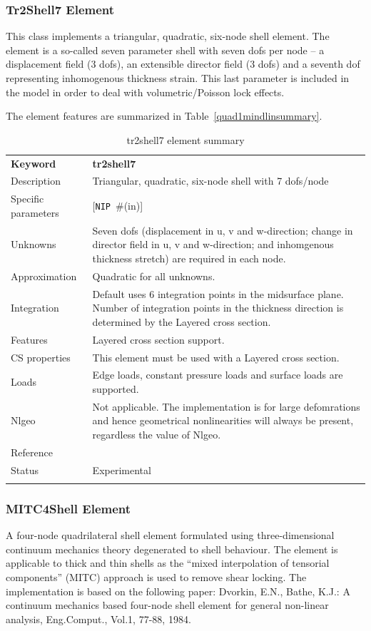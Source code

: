 \documentclass[a4paper]{article}
\newcommand{\param}[1]{\texttt{#1}} %
\newcommand{\optional}[1]{[#1]} %
\newcommand{\field}[2]{\param{#1}~\#{\tiny(#2)}} %
\newcommand{\optField}[2]{\optional{\field{#1}{#2}}}
\newcommand{\templabel}{}%
\newcommand{\tempcaption}{}%
\newcounter{nelpar}
\newenvironment{elementsummary}[5]{%
  \gdef\tempcaption{#4}%
  \gdef\templabel{#5}%
  \setcounter{nelpar}{0}%
  \begin{center} %
    \begin{table}[!htb] %
      \begin{tabular}{|l|p{9cm}|}\hline %
        {\bf Keyword} & \bf{#1}\\ %
        {Description} & {#2}\\ %
        {Specific parameters} & {#3}\\ \hline %
}{
  \\ \hline %
      \end{tabular}%
      \caption{\tempcaption}%
      \label{\templabel}%
    \end{table}%
  \end{center}%
}
\newcommand{\elementDescription}[2]{{#1} & {#2}\\}
\begin{document}
\subsubsection{Tr2Shell7 Element} \label{tr2shell7}
This class implements a triangular, quadratic, six-node shell element. The element is a so-called seven parameter shell with seven dofs per node -- a displacement field (3 dofs), an extensible director field (3 dofs) and a seventh dof representing inhomogenous thickness strain. This last parameter is included in the model in order to deal with volumetric/Poisson lock effects.

The element features are summarized in Table~\ref{quad1mindlinsummary}.

\begin{elementsummary}{tr2shell7}{Triangular, quadratic, six-node shell with 7 dofs/node}{\optField{NIP}{in}}{tr2shell7 element summary}{tr2shell7summary}

\elementDescription{Unknowns}{Seven dofs (displacement in u, v and w-direction; change in director field in u, v and w-direction; and inhomgenous thickness stretch) are required in each node.}
\elementDescription{Approximation}{Quadratic for all unknowns.}
\elementDescription{Integration}{Default uses 6 integration points in the midsurface plane. Number of integration points in the thickness direction is determined by the Layered cross section.}
\elementDescription{Features}{Layered cross section support.}
\elementDescription{CS properties}{This element must be used with a Layered cross section.}
\elementDescription{Loads}{Edge loads, constant pressure loads and surface loads are supported.}
\elementDescription{Nlgeo}{Not applicable. The implementation is for large defomrations and hence geometrical nonlinearities will always be present, regardless the value of Nlgeo.}
\elementDescription{Reference}{\cite{RagnarLarsson2011}}
\elementDescription{Status}{Experimental}
\end{elementsummary}



\subsubsection {MITC4Shell Element}
A four-node quadrilateral shell element formulated using three-dimensional continuum mechanics theory degenerated to shell behaviour. The element is applicable to thick and thin shells as the ``mixed interpolation of tensorial components'' (MITC) approach is used to remove shear locking. The implementation is based on the following paper: Dvorkin, E.N., Bathe, K.J.: A continuum mechanics based four-node shell element for general non-linear analysis, Eng.Comput., Vol.1, 77-88, 1984. 
\end{document}
